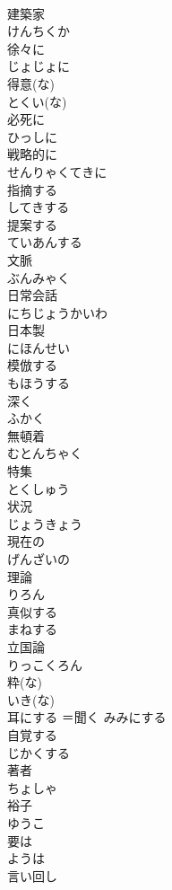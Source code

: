 \documentclass[8pt]{extreport}
\begin{document}
\begin{CJK}{UTF8}{min}
\\	建築家	
\\	けんちくか
\\	徐々に	
\\	じょじょに
\\	得意(な)	
\\	とくい(な)
\\	必死に	
\\	ひっしに
\\	戦略的に	
\\	せんりゃくてきに
\\	指摘する	
\\	してきする
\\	提案する	
\\	ていあんする
\\	文脈	
\\	ぶんみゃく
\\	日常会話	
\\	にちじょうかいわ
\\	日本製	
\\	にほんせい
\\	模倣する	
\\	もほうする
\\	深く	
\\	ふかく
\\	無頓着	
\\	むとんちゃく
\\	特集	
\\	とくしゅう
\\	状況	
\\	じょうきょう
\\	現在の	
\\	げんざいの
\\	理論	
\\	りろん
\\	真似する	
\\	まねする
\\	立国論	
\\	りっこくろん
\\	粋(な)	
\\	いき(な)
\\	耳にする	＝聞く	みみにする
\\	自覚する	
\\	じかくする
\\	著者	
\\	ちょしゃ
\\	裕子	
\\	ゆうこ
\\	要は	
\\	ようは
\\	言い回し	

\end{CJK}
\end{document}
